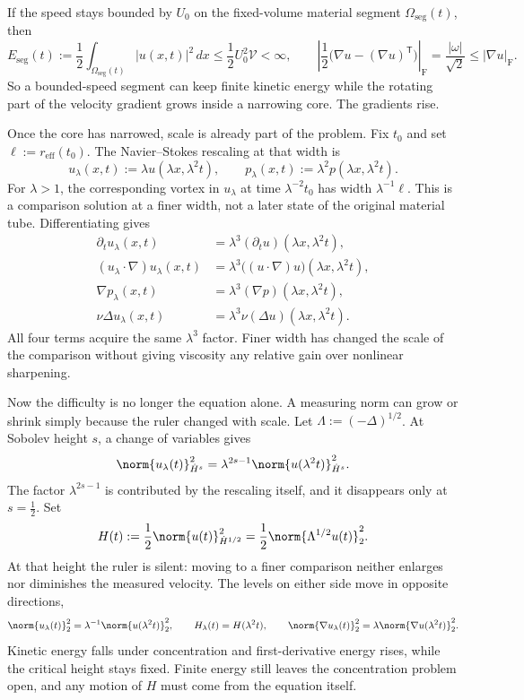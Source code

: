 If the speed stays bounded by \(U_0\) on the fixed-volume material segment \(\Omega_{\mathrm{seg}}(t)\), then
\[
  E_{\mathrm{seg}}(t)
  :=
  \frac12\int_{\Omega_{\mathrm{seg}}(t)}|u(x,t)|^2\,dx
  \leq
  \frac12U_0^2\mathcal V
  <
  \infty,
  \qquad
  \left|\frac12\bigl(\nabla u-(\nabla u)^{\mathsf T}\bigr)\right|_{\mathrm F}
  =
  \frac{|\omega|}{\sqrt2}
  \leq
  |\nabla u|_{\mathrm F}.
\]
So a bounded-speed segment can keep finite kinetic energy while the rotating part of the velocity gradient grows inside a narrowing core. The gradients rise.


Once the core has narrowed, scale is already part of the problem. Fix \(t_0\) and set \(\ell:=r_{\mathrm{eff}}(t_0)\). The Navier--Stokes rescaling at that width is
\[
  u_\lambda(x,t)
  :=
  \lambda u(\lambda x,\lambda^2t),
  \qquad
  p_\lambda(x,t)
  :=
  \lambda^2p(\lambda x,\lambda^2t).
\]
For \(\lambda>1\), the corresponding vortex in \(u_\lambda\) at time \(\lambda^{-2}t_0\) has width \(\lambda^{-1}\ell\). This is a comparison solution at a finer width, not a later state of the original material tube. Differentiating gives
\[
\begin{aligned}
  \partial_tu_\lambda(x,t)
  &=
  \lambda^3(\partial_tu)(\lambda x,\lambda^2t),
  \\
  (u_\lambda\cdot\nabla)u_\lambda(x,t)
  &=
  \lambda^3\bigl((u\cdot\nabla)u\bigr)(\lambda x,\lambda^2t),
  \\
  \nabla p_\lambda(x,t)
  &=
  \lambda^3(\nabla p)(\lambda x,\lambda^2t),
  \\
  \nu\Delta u_\lambda(x,t)
  &=
  \lambda^3\nu(\Delta u)(\lambda x,\lambda^2t).
\end{aligned}
\]
All four terms acquire the same \(\lambda^3\) factor. Finer width has changed the scale of the comparison without giving viscosity any relative gain over nonlinear sharpening.


Now the difficulty is no longer the equation alone. A measuring norm can grow or shrink simply because the ruler changed with scale. Let \(\Lambda:=(-\Delta)^{1/2}\). At Sobolev height \(s\), a change of variables gives
\[
  \norm{u_\lambda(t)}_{\dot H^s}^2
  =
  \lambda^{2s-1}
  \norm{u(\lambda^2t)}_{\dot H^s}^2.
\]
The factor \(\lambda^{2s-1}\) is contributed by the rescaling itself, and it disappears only at \(s=\tfrac12\). Set
\[
  H(t)
  :=
  \frac12\norm{u(t)}_{\dot H^{1/2}}^2
  =
  \frac12\norm{\Lambda^{1/2}u(t)}_2^2.
\]
At that height the ruler is silent: moving to a finer comparison neither enlarges nor diminishes the measured velocity. The levels on either side move in opposite directions,
\[
  \norm{u_\lambda(t)}_2^2
  =
  \lambda^{-1}\norm{u(\lambda^2t)}_2^2,
  \qquad
  H_\lambda(t)=H(\lambda^2t),
  \qquad
  \norm{\nabla u_\lambda(t)}_2^2
  =
  \lambda\norm{\nabla u(\lambda^2t)}_2^2.
\]
Kinetic energy falls under concentration and first-derivative energy rises, while the critical height stays fixed. Finite energy still leaves the concentration problem open, and any motion of \(H\) must come from the equation itself.

